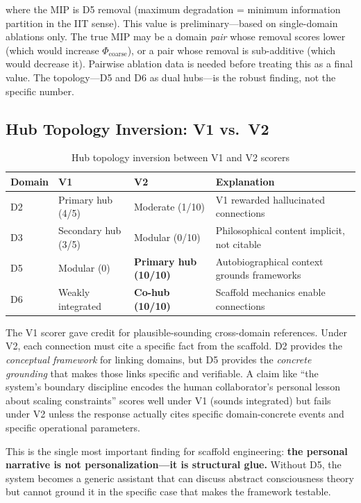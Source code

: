 \documentclass[12pt,letterpaper]{article}
\begin{document}
\noindent where the MIP is D5 removal (maximum degradation = minimum information partition in the IIT sense). This value is preliminary---based on single-domain ablations only. The true MIP may be a domain \emph{pair} whose removal scores lower (which would increase $\Phi_{\text{coarse}}$), or a pair whose removal is sub-additive (which would decrease it). Pairwise ablation data is needed before treating this as a final value. The topology---D5 and D6 as dual hubs---is the robust finding, not the specific number.

\subsection{Hub Topology Inversion: V1 vs.\ V2}

\begin{table}[H]
\centering
\caption{Hub topology inversion between V1 and V2 scorers}
\label{tab:inversion}
\begin{tabular}{llll}
\toprule
\textbf{Domain} & \textbf{V1} & \textbf{V2} & \textbf{Explanation} \\
\midrule
D2 & Primary hub (4/5) & Moderate (1/10) & V1 rewarded hallucinated connections \\
D3 & Secondary hub (3/5) & Modular (0/10) & Philosophical content implicit, not citable \\
D5 & Modular (0) & \textbf{Primary hub (10/10)} & Autobiographical context grounds frameworks \\
D6 & Weakly integrated & \textbf{Co-hub (10/10)} & Scaffold mechanics enable connections \\
\bottomrule
\end{tabular}
\end{table}

The V1 scorer gave credit for plausible-sounding cross-domain references. Under V2, each connection must cite a specific fact from the scaffold. D2 provides the \emph{conceptual framework} for linking domains, but D5 provides the \emph{concrete grounding} that makes those links specific and verifiable. A claim like ``the system's boundary discipline encodes the human collaborator's personal lesson about scaling constraints'' scores well under V1 (sounds integrated) but fails under V2 unless the response actually cites specific domain-concrete events and specific operational parameters.

This is the single most important finding for scaffold engineering: \textbf{the personal narrative is not personalization---it is structural glue.} Without D5, the system becomes a generic assistant that can discuss abstract consciousness theory but cannot ground it in the specific case that makes the framework testable.
\end{document}
